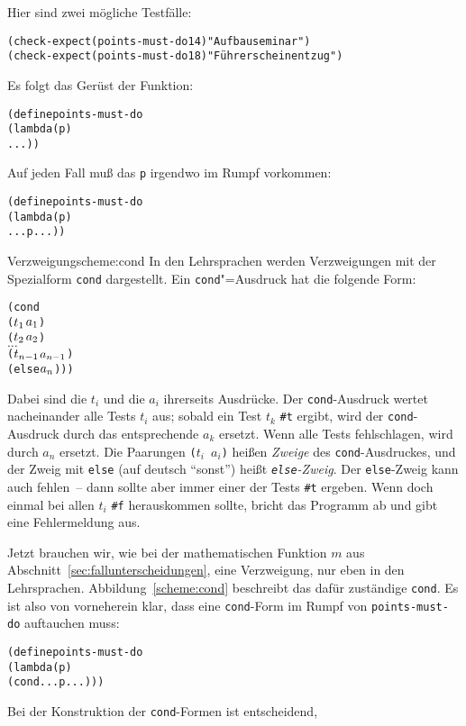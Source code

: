 Hier sind zwei mögliche Testfälle:
%
\begin{alltt}
(check-expect (points-must-do 14) "Aufbauseminar")
(check-expect (points-must-do 18) "Führerscheinentzug")
\end{alltt}   
%
Es folgt das Gerüst der Funktion:
%
\begin{alltt}
(define points-must-do
  (lambda (p)
    ...))
\end{alltt}
%
Auf jeden Fall muß das \texttt{p} irgendwo im Rumpf vorkommen:
%
\begin{alltt}
(define points-must-do
  (lambda (p)
    ... p ...))
\end{alltt}
%
\begin{feature}{Verzweigung}{scheme:cond}
In den Lehrsprachen werden Verzweigungen
mit der Spezialform \texttt{cond} dargestellt.
Ein \texttt{cond}"=Ausdruck hat die folgende Form:
%
\begin{alltt}
(cond
  (\(t\sb{1}\) \(a\sb{1}\))
  (\(t\sb{2}\) \(a\sb{2}\))
  \(\ldots\)
  (\(t\sb{n-1}\) \(a\sb{n-1}\))
  (else \(a\sb{n}\))))
\end{alltt}
%
Dabei sind die $t_i$ und die $a_i$ ihrerseits Ausdrücke.  Der
\texttt{cond}-Ausdruck wertet nacheinander alle Tests $t_i$ aus;
sobald ein Test $t_k$ \texttt{\#t} ergibt, wird der
\texttt{cond}-Ausdruck durch das entsprechende $a_k$ ersetzt.  Wenn
alle Tests fehlschlagen, wird durch $a_n$ ersetzt.  Die Paarungen
\texttt{($t_i$ $a_i$)} heißen \textit{Zweige} des
\texttt{cond}-Ausdruckes, und der Zweig mit \texttt{else} (auf deutsch
"`sonst"') heißt
\textit{\texttt{else}-Zweig}.
Der \texttt{else}-Zweig kann auch fehlen~-- dann sollte aber immer
einer der Tests \texttt{\#t} ergeben.  Wenn doch einmal bei allen
$t_i$ \verb|#f| herauskommen sollte, bricht \drscheme{} das Programm ab
und gibt eine Fehlermeldung aus.
\end{feature}
%
Jetzt brauchen wir, wie bei der mathematischen Funktion $m$ aus
Abschnitt~\ref{sec:fallunterscheidungen}, eine Verzweigung, nur eben
in den Lehrsprachen.  Abbildung~\ref{scheme:cond} beschreibt das dafür
zuständige \texttt{cond}.   Es ist also von vorneherein klar, dass eine
\texttt{cond}-Form im Rumpf von \texttt{points-must-do} auftauchen muss:
%
\begin{alltt}
(define points-must-do
  (lambda (p)
    (cond ... p ...)))
\end{alltt}
%
Bei der Konstruktion der \texttt{cond}-Formen ist entscheidend,
